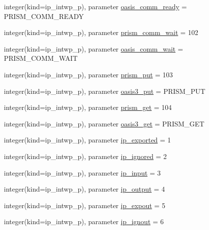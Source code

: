 \begin{DoxyCompactItemize}
\item 
integer(kind=ip\+\_\+intwp\+\_\+p), parameter \hyperlink{namespacemod__oasis__parameters_a8484e196ef7469adbeaef850787d7502}{oasis\+\_\+comm\+\_\+ready} = P\+R\+I\+S\+M\+\_\+\+C\+O\+M\+M\+\_\+\+R\+E\+A\+DY
\item 
integer(kind=ip\+\_\+intwp\+\_\+p), parameter \hyperlink{namespacemod__oasis__parameters_a3d0349d8815bf1848122d99993097842}{prism\+\_\+comm\+\_\+wait} = 102
\item 
integer(kind=ip\+\_\+intwp\+\_\+p), parameter \hyperlink{namespacemod__oasis__parameters_a9df795bd9123857642aae31661b6c13a}{oasis\+\_\+comm\+\_\+wait} = P\+R\+I\+S\+M\+\_\+\+C\+O\+M\+M\+\_\+\+W\+A\+IT
\item 
integer(kind=ip\+\_\+intwp\+\_\+p), parameter \hyperlink{namespacemod__oasis__parameters_ad8db79b2d411e8f04445dcc2ed619548}{prism\+\_\+put} = 103
\item 
integer(kind=ip\+\_\+intwp\+\_\+p), parameter \hyperlink{namespacemod__oasis__parameters_a325334a5e2f9d0c7846c1ef964f9f7e3}{oasis3\+\_\+put} = P\+R\+I\+S\+M\+\_\+\+P\+UT
\item 
integer(kind=ip\+\_\+intwp\+\_\+p), parameter \hyperlink{namespacemod__oasis__parameters_a136a476f2771e33d12e42b47eef72f9b}{prism\+\_\+get} = 104
\item 
integer(kind=ip\+\_\+intwp\+\_\+p), parameter \hyperlink{namespacemod__oasis__parameters_aa2ac99363b8f1aa7ff950fda3e3f5fff}{oasis3\+\_\+get} = P\+R\+I\+S\+M\+\_\+\+G\+ET
\item 
integer(kind=ip\+\_\+intwp\+\_\+p), parameter \hyperlink{namespacemod__oasis__parameters_a0f729cda95773cdc8df800eacdceb606}{ip\+\_\+exported} = 1
\item 
integer(kind=ip\+\_\+intwp\+\_\+p), parameter \hyperlink{namespacemod__oasis__parameters_ae3733a399c07b165b5ad19543ca1d2a2}{ip\+\_\+ignored} = 2
\item 
integer(kind=ip\+\_\+intwp\+\_\+p), parameter \hyperlink{namespacemod__oasis__parameters_a6a7bcd0e3a33573729f94098ecd9a922}{ip\+\_\+input} = 3
\item 
integer(kind=ip\+\_\+intwp\+\_\+p), parameter \hyperlink{namespacemod__oasis__parameters_a556f148d126d8d6dfe711656024436e6}{ip\+\_\+output} = 4
\item 
integer(kind=ip\+\_\+intwp\+\_\+p), parameter \hyperlink{namespacemod__oasis__parameters_ae91d5161b091e1f07e6ee64a38514df6}{ip\+\_\+expout} = 5
\item 
integer(kind=ip\+\_\+intwp\+\_\+p), parameter \hyperlink{namespacemod__oasis__parameters_a4d283e27ebb49e8d97a35842f10d9aec}{ip\+\_\+ignout} = 6

\end{DoxyCompactItemize}
